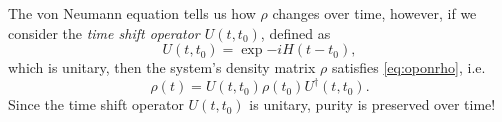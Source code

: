 \documentclass{../_mypackages/monograph}
\begin{document}
The von Neumann equation tells us how \(\rho\) changes over time, however, if we consider the \emph{time shift operator \(U(t,t_0)\)}, defined as
\begin{equation}
    U(t,t_0) = \exp{-i H(t-t_0)},
\end{equation}
which is unitary, then the system's density matrix \(\rho\) satisfies \eqref{eq:oponrho}, i.e.
\begin{equation}
    \rho(t) = U(t,t_0) \rho(t_0) U^\dagger (t,t_0).
\end{equation}
Since the time shift operator \(U(t,t_0)\) is unitary, purity is preserved over time!

\end{document}
